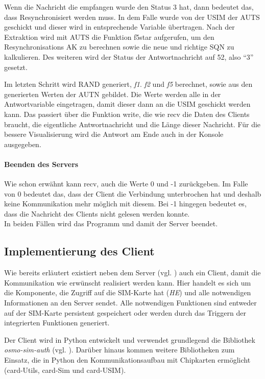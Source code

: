		Wenn die Nachricht die empfangen wurde den Status 3 hat, dann bedeutet das, dass Resynchronisiert werden
		muss. In dem Falle wurde von der USIM der AUTS geschickt und dieser wird in entsprechende Variable übertragen.
		Nach der Extraktion wird mit AUTS die Funktion f5star aufgerufen, um den Resynchronisations AK zu berechnen
		sowie die neue und richtige SQN zu kalkulieren. Des weiteren wird der Status der Antwortnachricht auf 52, also ``3''
		gesetzt.
		
		Im letzten Schritt wird RAND generiert, \emph{f1}. \emph{f2} und \emph{f5} berechnet, sowie aus den generierten
		Werten der AUTN gebildet. Die Werte werden alle in der Antwortvariable eingetragen, damit dieser dann an die USIM
		geschickt werden kann. Das passiert über die Funktion write, die wie recv die Daten des Clients braucht, die eigentliche
		Antwortnachricht und die Länge dieser Nachricht. Für die bessere Visualisierung wird die Antwort am Ende auch in
		der Konsole ausgegeben.
		
		\paragraph{Beenden des Servers}
		Wie schon erwähnt kann recv, auch die Werte 0 und -1 zurückgeben. Im Falle von 0 bedeutet das, dass der Client
		die Verbindung unterbrochen hat und deshalb keine Kommunikation mehr möglich mit diesem. Bei -1 hingegen bedeutet
		es, dass die Nachricht des Clients nicht gelesen werden konnte. \\
		In beiden Fällen wird das Programm und damit der Server beendet.

    \subsection{Implementierung des Client}
    Wie bereits erläutert existiert neben dem Server (vgl. ) auch ein Client,
    damit die Kommunikation wie erwünscht realisiert werden kann. Hier handelt es sich um die Komponente,
    die Zugriff auf die SIM-Karte hat (\emph{HE}) und alle notwendigen Informationen an den Server sendet.
    Alle notwendigen Funktionen sind entweder auf der SIM-Karte persistent gespeichert oder werden durch
    das Triggern der integrierten Funktionen generiert.

    Der Client wird in Python entwickelt und verwendet grundlegend die Bibliothek \textit{osmo-sim-auth}
    (vgl. ). Darüber hinaus kommen weitere  Bibliotheken zum Einsatz, die in
    Python den Kommunikationsaufbau mit Chipkarten ermöglicht (card-Utils, card-Sim und card-USIM).

